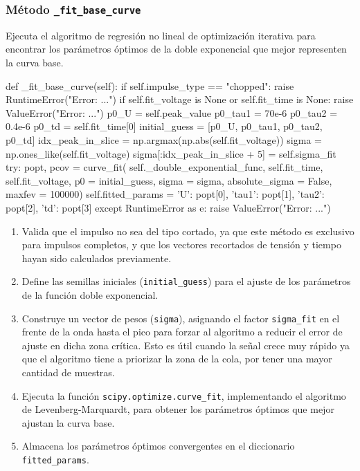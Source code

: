 \subsubsection{Método \texttt{\_fit\_base\_curve}}
Ejecuta el algoritmo de regresión no lineal de optimización iterativa para encontrar los parámetros óptimos de la doble exponencial que mejor representen la curva base.

\begin{python}
def _fit_base_curve(self):
    if self.impulse_type == "chopped":
        raise RuntimeError("Error: ...")
    if self.fit_voltage is None or self.fit_time is None:
        raise ValueError("Error: ...")
    p0_U = self.peak_value
    p0_tau1 = 70e-6
    p0_tau2 = 0.4e-6
    p0_td = self.fit_time[0]
    initial_guess = [p0_U, p0_tau1, p0_tau2, p0_td]
    idx_peak_in_slice = np.argmax(np.abs(self.fit_voltage))
    sigma = np.ones_like(self.fit_voltage)
    sigma[:idx_peak_in_slice + 5] = self.sigma_fit
    try:
        popt, pcov = curve_fit(
            self._double_exponential_func,
            self.fit_time,
            self.fit_voltage,
            p0 = initial_guess,
            sigma = sigma,
            absolute_sigma = False,
            maxfev = 100000)
        self.fitted_params = {
            'U': popt[0],
            'tau1': popt[1],
            'tau2': popt[2],
            'td': popt[3]}
    except RuntimeError as e:
        raise ValueError("Error: ...")
\end{python}

\begin{enumerate}
    \item Valida que el impulso no sea del tipo cortado, ya que este método es exclusivo para impulsos completos, y que los vectores recortados de tensión y tiempo hayan sido calculados previamente.
    \item Define las semillas iniciales (\texttt{initial\_guess}) para el ajuste de los parámetros de la función doble exponencial.
    \item Construye un vector de pesos (\texttt{sigma}), asignando el factor \texttt{sigma\_fit} en el frente de la onda hasta el pico para forzar al algoritmo a reducir el error de ajuste en dicha zona crítica. Esto es útil cuando la señal crece muy rápido ya que el algoritmo tiene a priorizar la zona de la cola, por tener una mayor cantidad de muestras.
    \item Ejecuta la función \texttt{scipy.optimize.curve\_fit}, implementando el algoritmo de Levenberg-Marquardt, para obtener los parámetros óptimos que mejor ajustan la curva base.
    \item Almacena los parámetros óptimos convergentes en el diccionario \texttt{fitted\_params}.
\end{enumerate}

